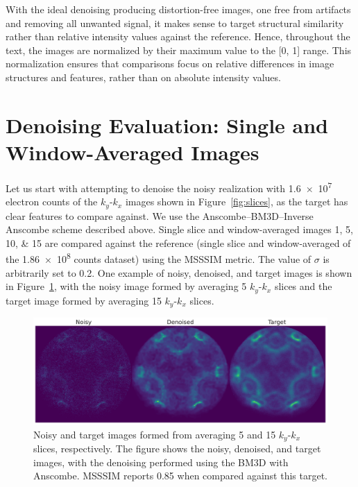 With the ideal denoising producing distortion-free images, one free from artifacts and removing all unwanted signal, it makes sense to target structural similarity rather than relative intensity values against the reference. Hence, throughout the text, the images are normalized by their maximum value to the [\num{0}, \num{1}] range. This normalization ensures that comparisons focus on relative differences in image structures and features, rather than on absolute intensity values.

\section{Denoising Evaluation: Single and Window-Averaged Images}
Let us start with attempting to denoise the noisy realization with \num{1.6e7} electron counts of the $k_y$-$k_x$ images shown in Figure~\ref{fig:slices}, as the target has clear features to compare against. We use the Anscombe--\gls{BM3D}--Inverse Anscombe scheme described above. Single slice and window-averaged images \numlist{1;5;10;15} are compared against the reference (single slice and window-averaged of the \num{1.86e8} counts dataset) using the \gls{MSSSIM} metric. The value of $\sigma$ is arbitrarily set to \num{0.2}. One example of noisy, denoised, and target images is shown in Figure~\ref{fig:noisy-denoised-ref-16M-avg-bm3d}, with the noisy image formed by averaging 5 $k_y$-$k_x$ slices and the target image formed by averaging 15 $k_y$-$k_x$ slices.

\begin{figure}[h]
    \centering
    \includegraphics[width=1\linewidth]{images/noisy_denoised_ref_16M_avg_bm3d.pdf}
    \caption{Noisy and target images formed from averaging 5 and 15 $k_y$-$k_x$ slices, respectively. The figure shows the noisy, denoised, and target images, with the denoising performed using the \gls{BM3D} with Anscombe. \gls{MSSSIM} reports \num{0.85} when compared against this target.}
    \label{fig:noisy-denoised-ref-16M-avg-bm3d}
\end{figure}


